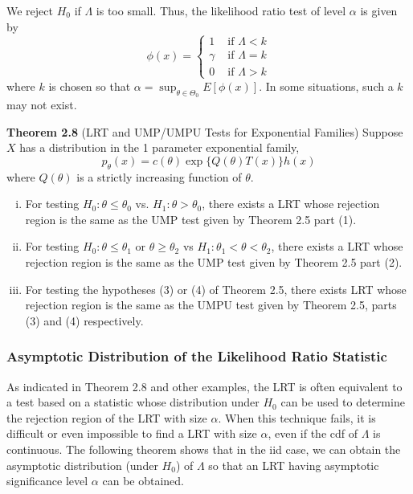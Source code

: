 \documentclass[12pt]{article}
\numberwithin{equation}{section}
\begin{document}
We reject $H_0$ if $\Lambda$ is too small. Thus, the likelihood ratio test of level $\alpha$ is given by
\begin{equation*}
  \phi(x) =
  \begin{cases}
    1         &\text{ if } \Lambda < k \\
    \gamma    &\text{ if } \Lambda = k \\
    0         &\text{ if } \Lambda > k
  \end{cases}
\end{equation*}
where $k$ is chosen so that 
$\alpha = \sup_{\theta \in \Theta_0} E[\phi(x)]$. In some situations, such a $k$ may not exist.

\textbf{Theorem 2.8} (LRT and UMP/UMPU Tests for Exponential Families)
Suppose $X$ has a distribution in the 1 parameter exponential family,
\begin{equation*}
  p_{\theta}(x) = c(\theta) \exp\{Q(\theta)T(x) \} h(x)
\end{equation*}
where $Q(\theta)$ is a strictly increasing function of $\theta$. 
%
\begin{enumerate}[(i)]
  \item For testing $H_0: \theta \le \theta_0$ vs. $H_1: \theta > \theta_0$, there exists a LRT whose rejection region is the same as the UMP test given by Theorem 2.5 part (1).
  \item For testing $H_0: \theta \le \theta_1$ or $\theta \ge \theta_2$ vs $H_1: \theta_1 < \theta < \theta_2$, there exists a LRT whose rejection region is the same as the UMP test given by Theorem 2.5 part (2).
  \item For testing the hypotheses (3) or (4) of Theorem 2.5, there exists LRT whose rejection region is the same as the UMPU test given by Theorem 2.5, parts (3) and (4) respectively.
\end{enumerate}

\subsubsection{Asymptotic Distribution of the Likelihood Ratio Statistic}
As indicated in Theorem 2.8 and other examples, the LRT is often equivalent
to a test based on a statistic whose distribution under $H_0$ can be used to determine the rejection region of the LRT with size $\alpha$. When this technique fails, it is difficult or even impossible to find a LRT with size $\alpha$, even if the cdf of $\Lambda$ is continuous. The following theorem shows that in the iid case, we can obtain the asymptotic distribution (under $H_0$) of $\Lambda$ so that an LRT having asymptotic significance level $\alpha$  can be obtained.
\end{document}
